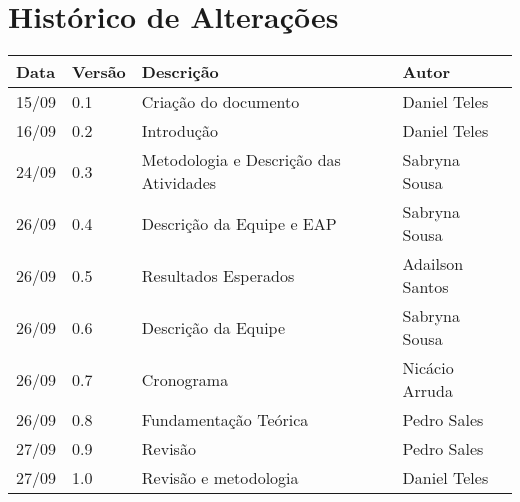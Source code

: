\chapter*{Histórico de Alterações}

\begin{table}[!htbp]
\centering
\label{my-label}
\begin{tabular}{|l|l|l|l|}
\hline
\textbf{Data} & \textbf{Versão} & \textbf{Descrição} & \textbf{Autor} \\ \hline
15/09         & 0.1             & Criação do documento     & Daniel Teles   \\ \hline
16/09         & 0.2             & Introdução         & Daniel Teles   \\ \hline
24/09         & 0.3             & Metodologia e Descrição das Atividades       & Sabryna Sousa  \\ \hline
26/09         & 0.4             & Descrição da Equipe e EAP       & Sabryna Sousa  \\ \hline
26/09         & 0.5             & Resultados Esperados       & Adailson Santos  \\ \hline
26/09         & 0.6             & Descrição da Equipe       & Sabryna Sousa  \\ \hline
26/09         & 0.7             & Cronograma       & Nicácio Arruda  \\ \hline
26/09         & 0.8             & Fundamentação Teórica     & Pedro Sales\\ \hline
27/09         & 0.9             & Revisão     & Pedro Sales\\ \hline
27/09         & 1.0             & Revisão e metodologia & Daniel Teles\\ \hline
\end{tabular}
\end{table}

\cleardoublepage
